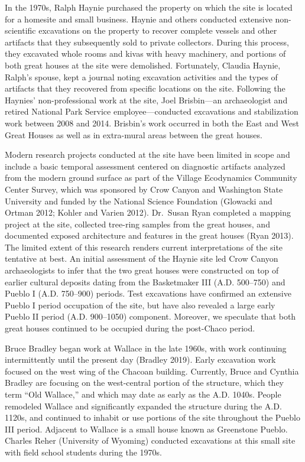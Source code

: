 \documentclass[
  12pt,
]{krantz}
\begin{document}
In the 1970s, Ralph Haynie purchased the property on which the site is
located for a homesite and small business. Haynie and others conducted
extensive non-scientific excavations on the property to recover complete
vessels and other artifacts that they subsequently sold to private
collectors. During this process, they excavated whole rooms and kivas
with heavy machinery, and portions of both great houses at the site were
demolished. Fortunately, Claudia Haynie, Ralph's spouse, kept a journal
noting excavation activities and the types of artifacts that they
recovered from specific locations on the site. Following the Haynies'
non-professional work at the site, Joel Brisbin---an archaeologist and
retired National Park Service employee---conducted excavations and
stabilization work between 2008 and 2014. Brisbin's work occurred in
both the East and West Great Houses as well as in extra-mural areas
between the great houses.

Modern research projects conducted at the site have been limited in
scope and include a basic temporal assessment centered on diagnostic
artifacts analyzed from the modern ground surface as part of the Village
Ecodynamics Community Center Survey, which was sponsored by Crow Canyon
and Washington State University and funded by the National Science
Foundation (Glowacki and Ortman 2012; Kohler and Varien 2012). Dr.~Susan
Ryan completed a mapping project at the site, collected tree-ring
samples from the great houses, and documented exposed architecture and
features in the great houses (Ryan 2013). The limited extent of this
research renders current interpretations of the site tentative at best.
An initial assessment of the Haynie site led Crow Canyon archaeologists
to infer that the two great houses were constructed on top of earlier
cultural deposits dating from the Basketmaker III (A.D. 500--750) and
Pueblo I (A.D. 750--900) periods. Test excavations have confirmed an
extensive Pueblo I period occupation of the site, but have also revealed
a large early Pueblo II period (A.D. 900--1050) component. Moreover, we
speculate that both great houses continued to be occupied during the
post-Chaco period.

Bruce Bradley began work at Wallace in the late 1960s, with work
continuing intermittently until the present day (Bradley 2019). Early
excavation work focused on the west wing of the Chacoan building.
Currently, Bruce and Cynthia Bradley are focusing on the west-central
portion of the structure, which they term ``Old Wallace,'' and which may
date as early as the A.D. 1040s. People remodeled Wallace and
significantly expanded the structure during the A.D. 1120s, and
continued to inhabit or use portions of the site throughout the Pueblo
III period. Adjacent to Wallace is a small house known as Greenstone
Pueblo. Charles Reher (University of Wyoming) conducted excavations at
this small site with field school students during the 1970s.
\end{document}
